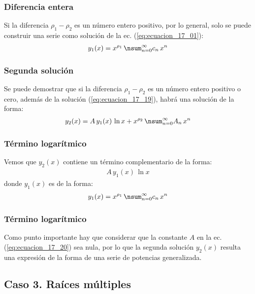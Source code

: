 \documentclass[12pt]{beamer}
\begin{document}
\begin{frame}
\frametitle{Diferencia entera}
Si la diferencia $\rho_{1} - \rho_{2}$ es un número entero positivo, por lo general, solo se puede construir una serie como solución de la ec. (\ref{eq:ecuacion_17_01}):
\pause
\begin{align}
y_{1}(x) = x^{\rho_{1}} \, \nsum_{n=0}^{\infty} c_{n} \, x^{n}
\label{eq:ecuacion_17_19}
\end{align}
\end{frame}
\begin{frame}
\frametitle{Segunda solución}
Se puede demostrar que si la diferencia $\rho_{1} - \rho_{2}$ es un número entero positivo o cero, además de la solución (\ref{eq:ecuacion_17_19}), habrá una solución de la forma:
\pause
\begin{align}
y_{2}(x) = A \, y_{1}(x) \, \ln x + x^{\rho_{2}} \, \nsum_{n=0}^{\infty} A_{n} \, x^{n}
\label{eq:ecuacion_17_20}
\end{align}
\end{frame}
\begin{frame}
\frametitle{Término logarítmico}
Vemos que $y_{2}(x)$ contiene un término complementario de la forma:
\pause
\begin{align*}
A \, y_{1} (x) \, \ln x
\end{align*}
\pause
donde $y_{1}(x)$ es de la forma:
\begin{align*}
y_{1}(x) = x^{\rho_{1}} \, \nsum_{n=0}^{\infty} c_{n} \, x^{n}
\end{align*}
\end{frame}
\begin{frame}
\frametitle{Término logarítmico}
Como punto importante hay que considerar que la constante $A$ en la ec. (\ref{eq:ecuacion_17_20}) sea nula, por lo que la segunda solución $y_{2}(x)$ resulta una expresión de la forma de una serie de potencias generalizada.
\end{frame}

\subsection{Caso 3. Raíces múltiples}
\end{document}
